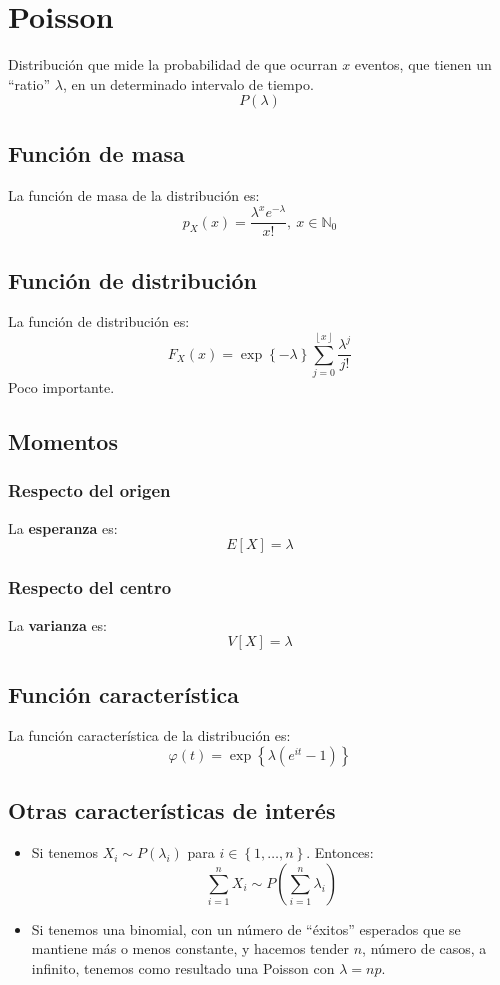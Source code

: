 \section{Poisson}
\label{sec:poisson}
Distribución que mide la probabilidad de que ocurran $x$ eventos, que tienen un
``ratio'' $\lambda$, en un determinado intervalo de tiempo.
\[
\boxed{P\left( \lambda \right)}
\]

\subsection{Función de masa}
La función de masa de la distribución es:
\[
p_X \left( x \right) = \frac{\lambda^x e^{-\lambda}}{x!},\ x \in \mathbb{N}_0
\]

\subsection{Función de distribución}
La función de distribución es:
\[
F_X\left( x \right) = \exp\left\{ -\lambda \right\}\sum_{j=0}^{\left\lfloor x \right\rfloor} \frac{\lambda^j}{j!} 
\]
Poco importante.

\subsection{Momentos}

\subsubsection*{Respecto del origen}
La \textbf{esperanza} es: 
\[
    E\left[ X \right] = \lambda
\]
\subsubsection*{Respecto del centro}
La \textbf{varianza} es:
\[
    V\left[ X \right] = \lambda
\]

\subsection{Función característica}
La función característica de la distribución es:
\[
\varphi\left( t \right) = \exp\left\{ \lambda\left( e^{it} - 1 \right) \right\}
\]

\subsection{Otras características de interés}
\begin{itemize}
    \item Si tenemos $X_i \sim P\left( \lambda_i \right)$ para $i \in\left\{ 1, \ldots, n \right\}$. Entonces:
    \[
    \sum_{i=1}^{n} X_i \sim P\left( \sum_{i=1}^{n} \lambda_i \right) 
    \]
    \item Si tenemos una binomial, con un número de ``éxitos'' esperados que se
      mantiene más o menos constante, y hacemos tender $n$, número de casos, a
      infinito, tenemos como resultado una Poisson con $\lambda = np$.
\end{itemize}
